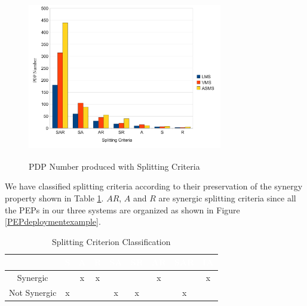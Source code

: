 \begin{figure}[!h]
\centering
\includegraphics[width=8.5cm, height=7.2cm]{pdpnumber.pdf}
\begin{center}
\caption{PDP Number produced with Splitting Criteria}
\label{pdpnumber}
\end{center}
\end{figure}

We have classified splitting criteria according to their preservation of the synergy property shown in 
Table \ref{Classification}. $AR$, $A$ and $R$ are synergic splitting criteria since all the PEPs in our three systems 
are organized as shown in Figure \ref{PEPdeploymentexample}. 

\begin{table}[t]
\centering
\begin{tabular}{|>{\tiny}c|>{\tiny}c|>{\tiny}c|>{\tiny}c|>{\tiny}c|>{\tiny}c|>{\tiny}c|>{\tiny}c|>{\tiny}c|}   
\hline  \rowcolor{black} \scriptsize \bf \textcolor {white}{}
& \scriptsize \bf \textcolor {white}{S}
& \scriptsize \bf \textcolor {white}{A}
& \scriptsize \bf \textcolor  {white}{R}
& \scriptsize \bf \textcolor  {white}{SA}
& \scriptsize \bf \textcolor  {white}{SR}
& \scriptsize \bf \textcolor  {white}{AR} 
& \scriptsize \bf \textcolor  {white}{SAR}
& \scriptsize \bf \textcolor {white}{IA}\\ \hline
\scriptsize  {Synergic}
&\scriptsize  {}
& \scriptsize {x}
& \scriptsize {x}
& \scriptsize {}
& \scriptsize {}
& \scriptsize {x}
& \scriptsize {}
& \scriptsize {x}
  \\ \hline
\scriptsize  {Not Synergic}
&\scriptsize  {x}
& \scriptsize {}
& \scriptsize {}
& \scriptsize {x}
& \scriptsize {x}
& \scriptsize {}
& \scriptsize {x}
& \scriptsize {}
  \\ \hline
\end{tabular}
\caption{Splitting Criterion Classification}
\label{Classification}
\end{table}

